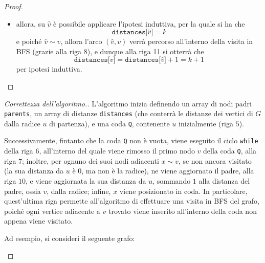 \documentclass[a4paper, 12pt]{report}
\begin{document}
\begin{proof}
\begin{itemize}
\begin{itemize}
                    \item allora, su $\hat v$ è possibile applicare l'ipotesi induttiva, per la quale si ha che $$\texttt{distances[}\hat v\texttt{]} = k$$ e poiché $\hat v \sim v$, allora l'arco $(\hat v, v)$ verrà percorso all'interno della visita in BFS (grazie alla riga 8), e dunque alla riga 11 si otterrà che $$\texttt{distances[}v\texttt{]} = \texttt{distances[}\hat v\texttt{]} + 1 = k + 1$$ per ipotesi induttiva.
                \end{itemize}
        \end{itemize}
    \end{proof}

    \begin{proof}[Correttezza dell'algoritmo.]
        L'algoritmo inizia definendo un array di nodi padri \texttt{parents}, un array di distanze \texttt{distances} (che conterrà le distanze dei vertici di $G$ dalla radice $u$ di partenza), e una coda \texttt{Q}, contenente $u$ inizialmente (riga $5$).

        Successivamente, fintanto che la coda \texttt{Q} non è vuota, viene eseguito il ciclo \texttt{while} della riga $6$, all'interno del quale viene rimosso il primo nodo $v$ della coda \texttt{Q}, alla riga $7$; inoltre, per ognuno dei suoi nodi adiacenti $x \sim v$, se non ancora visitato (la sua distanza da $u$ è $0$, ma non è la radice), ne viene aggiornato il padre, alla riga $10$, e viene aggiornata la sua distanza da $u$, sommando $1$ alla distanza del padre, ossia $v$, dalla radice; infine, $x$ viene posizionato in coda. In particolare, quest'ultima riga permette all'algoritmo di effettuare una visita in BFS del grafo, poiché ogni vertice adiacente a $v$ trovato viene inserito all'interno della coda non appena viene visitato.

        Ad esempio, si consideri il seguente grafo:

        \begin{figure}[H]
            \centering
\end{figure}
\end{proof}
\end{document}
